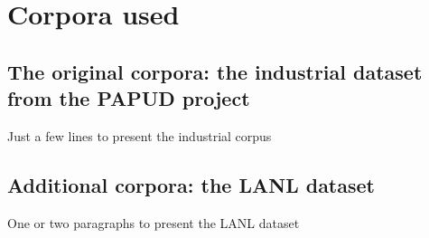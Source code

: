 \chapter{Corpora used}

\section{The original corpora: the industrial dataset from the PAPUD project}
Just a few lines to present the industrial corpus

\section{Additional corpora: the LANL dataset}
One or two paragraphs to present the LANL dataset